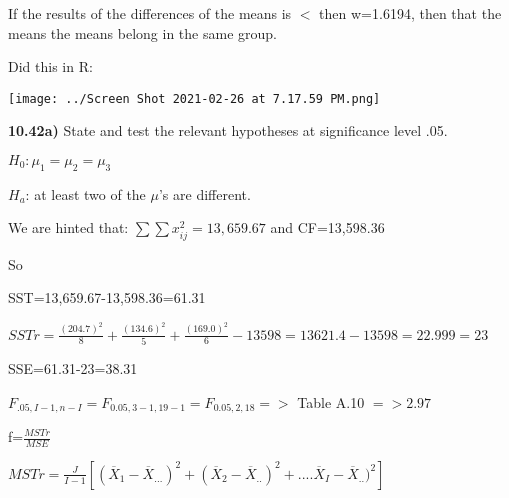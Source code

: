 \documentclass{article}
\begin{document}
If the results of the differences of the means is $<$ then w=1.6194, then that the means the means belong in the same group.

\vspace{2mm}

Did this in R:

\vspace{2mm}

\texttt{[image: ../Screen Shot 2021-02-26 at 7.17.59 PM.png]}



\newpage
\textbf{10.42a)} State and test the relevant hypotheses at significance level .05. 

\vspace{2mm}


$H_{0}: \mu_{1}=\mu_{2}=\mu_{3}$

\vspace{2mm}

$H_{a}$: at least two of the $\mu$'s are different.


\vspace{2mm}

We are hinted that: $\sum \sum x^{2}_{ij}=13,659.67$ and CF=13,598.36

\vspace{2mm}

So 

\vspace{2mm}

SST=13,659.67-13,598.36=61.31

\vspace{2mm}

$SSTr=\frac{(204.7)^{2}}{8}+\frac{(134.6)^{2}}{5}+\frac{(169.0)^{2}}{6}-13598=13621.4-13598=22.999=23$

\vspace{2mm}

SSE=61.31-23=38.31

\vspace{2mm}

$F_{.05,I-1,n-I}=F_{0.05, 3-1, 19-1}=F_{0.05, 2, 18} =>$ Table A.10 $=>2.97$ 

\vspace{2mm}

f=$\frac{MSTr}{MSE}$

\vspace{2mm}

$MSTr=\frac{J}{I-1}[(\overline{X}_{1}-\overline{X}_{...})^{2}+(\overline{X}_{2}-\overline{X}_{..})^{2}+....\overline{X}_{I}-\overline{X}_{..})^{2}]$
\end{document}
